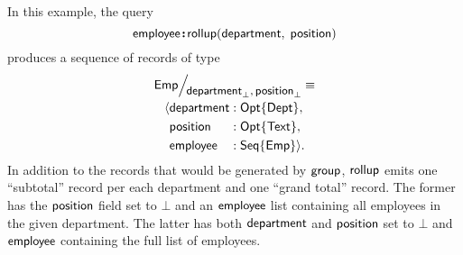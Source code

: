 In this example, the query
\begin{equation*}
    \mathsf{employee}\!\boldsymbol{:}\!\mathsf{rollup}(\mathsf{department},\; \mathsf{position})
\end{equation*}
produces a sequence of records of type
\begin{multline*}
    \Quotient{\Emp}{\Department_{\bot},\Position_{\bot}} \equiv \\
    \begin{alignedat}{3}
        & \Tuple{&& \Department && : \Opt{\Dept}, \\
        & && \Position && : \Opt{\Text}, \\
        & && \Employee && : \Seq{\Emp}}.
    \end{alignedat}
\end{multline*}
In addition to the records that would be generated by $\mathsf{group}$, $\mathsf{rollup}$ emits
one ``subtotal'' record per each department and one ``grand total'' record.
The former has the $\mathsf{position}$ field set to $\bot$ and an $\mathsf{employee}$ list
containing all employees in the given department.  The latter has both
$\mathsf{department}$ and $\mathsf{position}$ set to $\bot$ and $\mathsf{employee}$ containing the full
list of employees.


